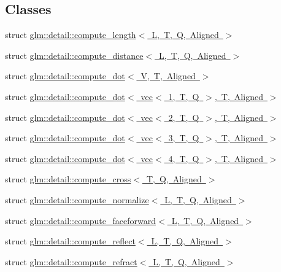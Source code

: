\subsection*{Classes}
\begin{DoxyCompactItemize}
\item 
struct \mbox{\hyperlink{structglm_1_1detail_1_1compute__length}{glm\+::detail\+::compute\+\_\+length$<$ L, T, Q, Aligned $>$}}
\item 
struct \mbox{\hyperlink{structglm_1_1detail_1_1compute__distance}{glm\+::detail\+::compute\+\_\+distance$<$ L, T, Q, Aligned $>$}}
\item 
struct \mbox{\hyperlink{structglm_1_1detail_1_1compute__dot}{glm\+::detail\+::compute\+\_\+dot$<$ V, T, Aligned $>$}}
\item 
struct \mbox{\hyperlink{structglm_1_1detail_1_1compute__dot_3_01vec_3_011_00_01_t_00_01_q_01_4_00_01_t_00_01_aligned_01_4}{glm\+::detail\+::compute\+\_\+dot$<$ vec$<$ 1, T, Q $>$, T, Aligned $>$}}
\item 
struct \mbox{\hyperlink{structglm_1_1detail_1_1compute__dot_3_01vec_3_012_00_01_t_00_01_q_01_4_00_01_t_00_01_aligned_01_4}{glm\+::detail\+::compute\+\_\+dot$<$ vec$<$ 2, T, Q $>$, T, Aligned $>$}}
\item 
struct \mbox{\hyperlink{structglm_1_1detail_1_1compute__dot_3_01vec_3_013_00_01_t_00_01_q_01_4_00_01_t_00_01_aligned_01_4}{glm\+::detail\+::compute\+\_\+dot$<$ vec$<$ 3, T, Q $>$, T, Aligned $>$}}
\item 
struct \mbox{\hyperlink{structglm_1_1detail_1_1compute__dot_3_01vec_3_014_00_01_t_00_01_q_01_4_00_01_t_00_01_aligned_01_4}{glm\+::detail\+::compute\+\_\+dot$<$ vec$<$ 4, T, Q $>$, T, Aligned $>$}}
\item 
struct \mbox{\hyperlink{structglm_1_1detail_1_1compute__cross}{glm\+::detail\+::compute\+\_\+cross$<$ T, Q, Aligned $>$}}
\item 
struct \mbox{\hyperlink{structglm_1_1detail_1_1compute__normalize}{glm\+::detail\+::compute\+\_\+normalize$<$ L, T, Q, Aligned $>$}}
\item 
struct \mbox{\hyperlink{structglm_1_1detail_1_1compute__faceforward}{glm\+::detail\+::compute\+\_\+faceforward$<$ L, T, Q, Aligned $>$}}
\item 
struct \mbox{\hyperlink{structglm_1_1detail_1_1compute__reflect}{glm\+::detail\+::compute\+\_\+reflect$<$ L, T, Q, Aligned $>$}}
\item 
struct \mbox{\hyperlink{structglm_1_1detail_1_1compute__refract}{glm\+::detail\+::compute\+\_\+refract$<$ L, T, Q, Aligned $>$}}
\end{DoxyCompactItemize}
